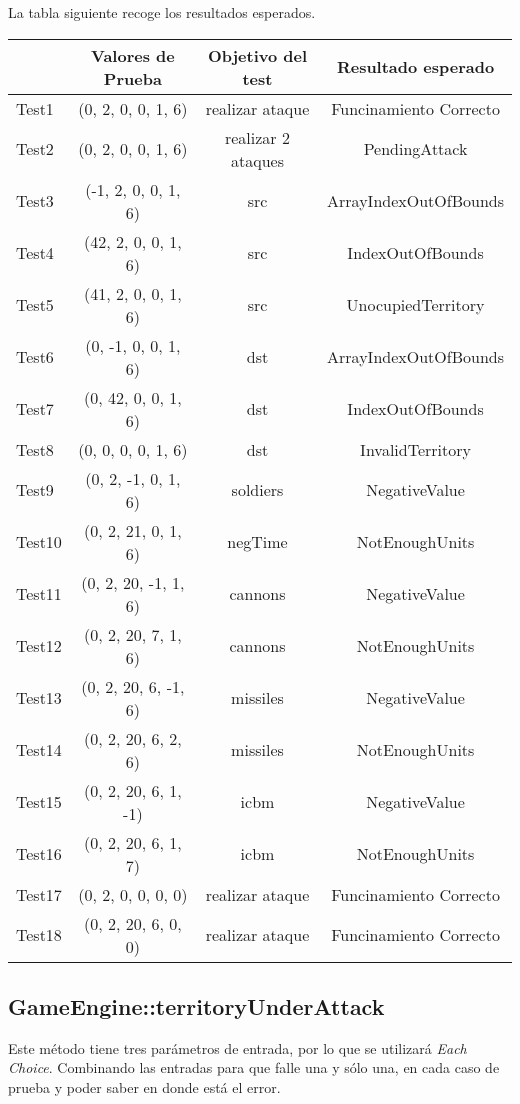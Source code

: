 La tabla siguiente recoge los resultados esperados.

{\footnotesize
\begin{longtable}[c]{lccc}
 & \textbf{Valores de Prueba} & \textbf{Objetivo del test} & \textbf{Resultado esperado} \\
\hline \hline
\endhead

Test1 & (0, 2, 0, 0, 1, 6)  & realizar ataque & Funcinamiento Correcto\\
Test2 & (0, 2, 0, 0, 1, 6)  & realizar 2 ataques & PendingAttack\\
Test3 & (-1, 2, 0, 0, 1, 6)  & src & ArrayIndexOutOfBounds\\
Test4 & (42, 2, 0, 0, 1, 6)  & src & IndexOutOfBounds\\
Test5 & (41, 2, 0, 0, 1, 6)  & src & UnocupiedTerritory\\
Test6 & (0, -1, 0, 0, 1, 6)  & dst  & ArrayIndexOutOfBounds\\
Test7 & (0, 42, 0, 0, 1, 6)  & dst & IndexOutOfBounds\\
Test8 & (0, 0, 0, 0, 1, 6)  & dst & InvalidTerritory\\
Test9 & (0, 2, -1, 0, 1, 6)  & soldiers & NegativeValue\\
Test10 & (0, 2, 21, 0, 1, 6)  & negTime & NotEnoughUnits\\
Test11 & (0, 2, 20, -1, 1, 6)  & cannons & NegativeValue\\
Test12 & (0, 2, 20, 7, 1, 6)  & cannons & NotEnoughUnits\\
Test13 & (0, 2, 20, 6, -1, 6)  & missiles & NegativeValue\\
Test14 & (0, 2, 20, 6, 2, 6)  & missiles & NotEnoughUnits\\
Test15 & (0, 2, 20, 6, 1, -1)  & icbm & NegativeValue\\
Test16 & (0, 2, 20, 6, 1, 7)  & icbm & NotEnoughUnits\\
Test17 & (0, 2, 0, 0, 0, 0)  & realizar ataque & Funcinamiento Correcto\\
Test18 & (0, 2, 20, 6, 0, 0)  & realizar ataque & Funcinamiento Correcto\\

\hline
\end{longtable}
}


\subsection{GameEngine::territoryUnderAttack}

Este método tiene tres parámetros de entrada, por lo que se utilizará \textit{Each Choice}. Combinando las entradas para que falle una y sólo una, en cada caso de prueba y poder saber en donde está el error.

